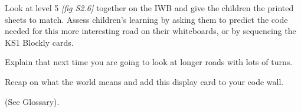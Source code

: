 \documentclass{../../../lessonplan}
\begin{document}
\begin{lessonplan}
Look at level 5 \textit{[fig S2.6]} together on the IWB and give the children the printed sheets to match.
Assess children's learning by asking them to predict the code needed for this more interesting road on their whiteboards, or by sequencing the KS1 Blockly cards.



Explain that next time you are going to look at longer roads with lots of turns.

Recap on what the world  means and add this display card to your code wall.

(See Glossary).


\end{lessonplan}
\end{document}
